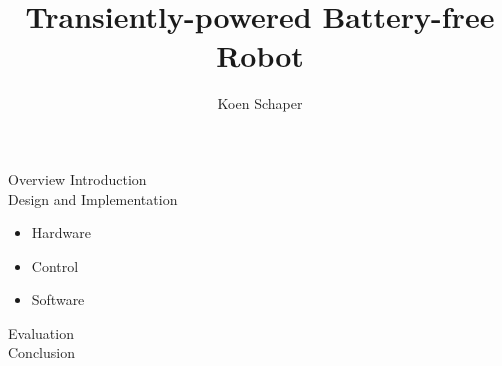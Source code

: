 \documentclass{beamer}
\title[]{Transiently-powered Battery-free Robot}
\institute[]{Delft University of Technology}
\author{Koen Schaper}
\begin{document}
{
\frame{\titlepage}
}

{

}

\begin{frame}{Overview}
		Introduction \\
		\vspace{1em}
		Design and Implementation
		\begin{itemize}
			\item Hardware
			\item Control
			\item Software
		\end{itemize}
		Evaluation \\
		\vspace{1em}
		Conclusion
\end{frame}
\end{document}
